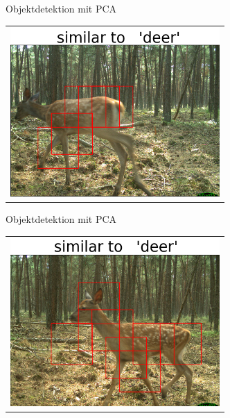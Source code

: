 \begin{frame}[t,fragile]{Objektdetektion mit PCA}
  \vspace{0.01em}
  {
\begin{table}
\centering
        \begin{tabular}{c}
        \includegraphics[width=8cm]{img/Segmentierung/seg(4).png}\\
         \end{tabular}
\end{table}
 }

\end{frame}


\begin{frame}[t,fragile]{Objektdetektion mit PCA}
  \vspace{0.01em}
  {
\begin{table}
\centering
        \begin{tabular}{c}
        \includegraphics[width=8cm]{img/Segmentierung/seg(5).png}\\
         \end{tabular}
\end{table}
 }

\end{frame}


